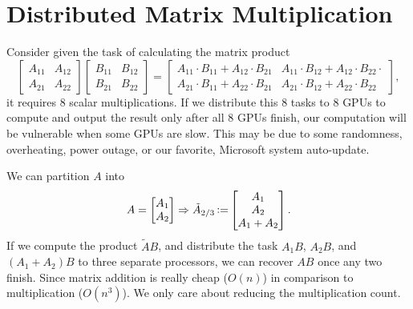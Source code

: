 \section{Distributed Matrix Multiplication} \label{sec:w13_distr_mat_mult}
Consider given the task of calculating the matrix product
\begin{equation*}
    \left[\begin{matrix}
        A_{11} & A_{12} \\
        A_{21} & A_{22}
    \end{matrix}\right] \left[\begin{matrix}
        B_{11} & B_{12} \\
        B_{21} & B_{22}
    \end{matrix}\right] = \left[\begin{matrix}
        A_{11}\cdot B_{11} + A_{12}\cdot B_{21} & A_{11}\cdot B_{12} + A_{12}\cdot B_{22} \cdot \\
        A_{21}\cdot B_{11} + A_{22}\cdot B_{21} & A_{21}\cdot B_{12} + A_{22}\cdot B_{22}
    \end{matrix}\right],
\end{equation*}
it requires $8$ scalar multiplications. If we distribute this $8$ tasks to $8$ GPUs to compute and output the result only after all $8$ GPUs finish, our computation will be vulnerable when some GPUs are slow. This may be due to some randomness, overheating, power outage, or our favorite, Microsoft system auto-update.

We can partition $A$ into
\begin{equation*}
    A = \left[\begin{matrix}
        A_1 \\ A_2
    \end{matrix}\right] \Rightarrow \tilde{A}_{2/3} \operatorname{\vcentcolon=} \left[\begin{matrix}
        A_1 \\ A_2 \\ A_1 + A_2
    \end{matrix}\right].
\end{equation*}
If we compute the product $\tilde{A}B$, and distribute the task $A_1B$, $A_2B$, and $(A_1+A_2)B$ to three separate processors, we can recover $AB$ once any two finish. Since matrix addition is really cheap ($O(n)$) in comparison to multiplication ($O(n^3)$). We only care about reducing the multiplication count.

